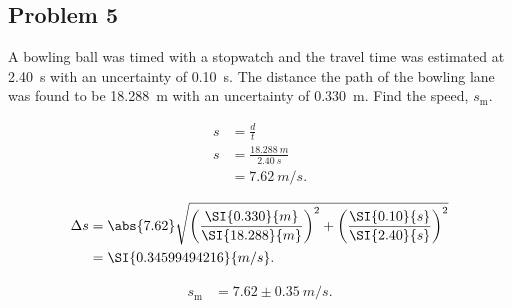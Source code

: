 
\subsection{Problem 5}

A bowling ball was timed with a stopwatch and the travel time was estimated at \SI{2.40}{s} with an uncertainty of \SI{0.10}{s}. The distance the path of the bowling lane was found to be \SI{18.288}{m} with an uncertainty of \SI{0.330}{m}. Find the speed, $s_{\mathrm{m}}$.

\begin{align*}
	s &= \frac{d}{t} \\
	s &= \frac{\SI{18.288}{m}}{\SI{2.40}{s}} \\
	&= \SI{7.62}{m/s}
	.\end{align*}

\begin{align*}
	\Delta s &= \abs{ 7.62 } \sqrt{\left( \frac{\SI{0.330}{m}}{\SI{18.288}{m}} \right)^2 + \left( \frac{\SI{0.10}{s}}{\SI{2.40}{s}} \right)^2} \\
	&= \SI{0.34599494216}{m/s}
	.\end{align*}

\begin{align*}
	s_{\mathrm{m}} &= 7.62 \pm \SI{0.35}{m/s}
	.\end{align*}
